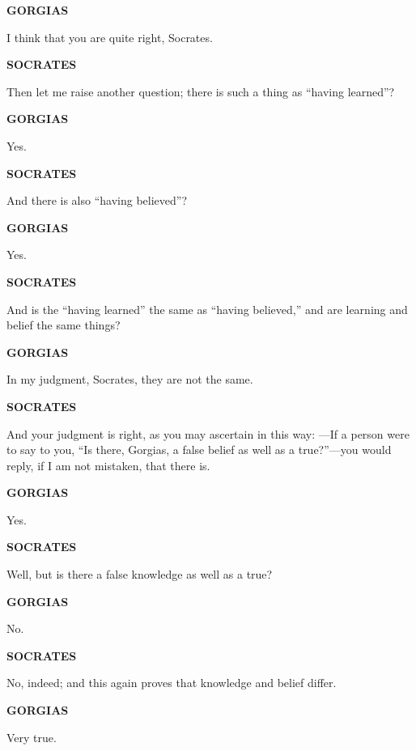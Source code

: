 \documentclass[11pt,letter]{article}
\begin{document}
\par \textbf{GORGIAS}
\par   I think that you are quite right, Socrates.

\par \textbf{SOCRATES}
\par   Then let me raise another question; there is such a thing as “having learned”?

\par \textbf{GORGIAS}
\par   Yes.

\par \textbf{SOCRATES}
\par   And there is also “having believed”?

\par \textbf{GORGIAS}
\par   Yes.

\par \textbf{SOCRATES}
\par   And is the “having learned” the same as “having believed,” and are learning and belief the same things?

\par \textbf{GORGIAS}
\par   In my judgment, Socrates, they are not the same.

\par \textbf{SOCRATES}
\par   And your judgment is right, as you may ascertain in this way: —If a person were to say to you, “Is there, Gorgias, a false belief as well as a true?”—you would reply, if I am not mistaken, that there is.

\par \textbf{GORGIAS}
\par   Yes.

\par \textbf{SOCRATES}
\par   Well, but is there a false knowledge as well as a true?

\par \textbf{GORGIAS}
\par   No.

\par \textbf{SOCRATES}
\par   No, indeed; and this again proves that knowledge and belief differ.

\par \textbf{GORGIAS}
\par   Very true.
\end{document}
